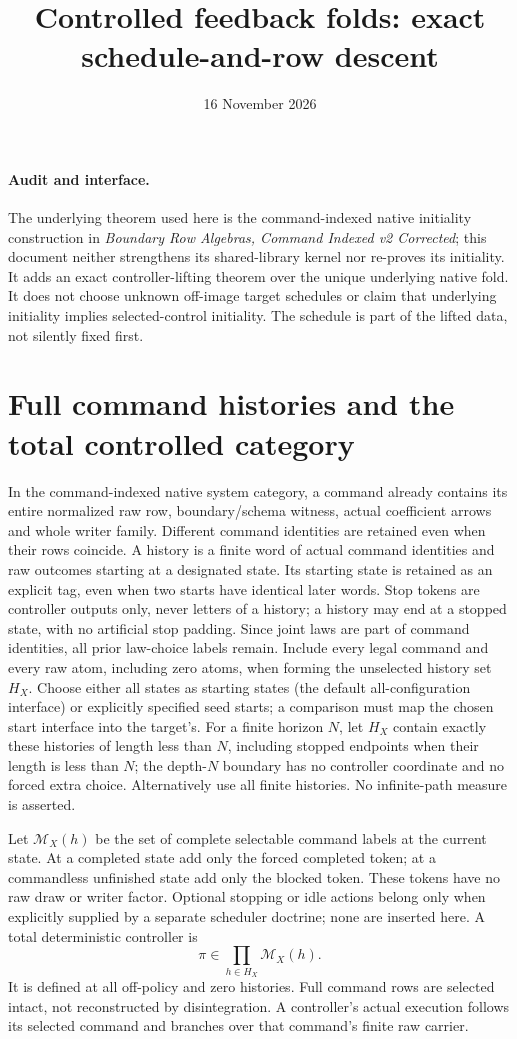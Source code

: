 \documentclass[11pt]{article}
\title{Controlled feedback folds: exact schedule-and-row descent}
\date{16 November 2026}
\begin{document}
\maketitle
\paragraph{Audit and interface.}
The underlying theorem used here is the command-indexed native initiality construction in \emph{Boundary Row Algebras, Command Indexed v2 Corrected}; this document neither strengthens its shared-library kernel nor re-proves its initiality. It adds an exact controller-lifting theorem over the unique underlying native fold. It does not choose unknown off-image target schedules or claim that underlying initiality implies selected-control initiality. The schedule is part of the lifted data, not silently fixed first.

\section{Full command histories and the total controlled category}
In the command-indexed native system category, a command already contains its entire normalized raw row, boundary/schema witness, actual coefficient arrows and whole writer family. Different command identities are retained even when their rows coincide. A history is a finite word of actual command identities and raw outcomes starting at a designated state. Its starting state is retained as an explicit tag, even when two starts have identical later words. Stop tokens are controller outputs only, never letters of a history; a history may end at a stopped state, with no artificial stop padding. Since joint laws are part of command identities, all prior law-choice labels remain. Include every legal command and every raw atom, including zero atoms, when forming the unselected history set $H_X$. Choose either all states as starting states (the default all-configuration interface) or explicitly specified seed starts; a comparison must map the chosen start interface into the target's. For a finite horizon $N$, let $H_X$ contain exactly these histories of length less than $N$, including stopped endpoints when their length is less than $N$; the depth-$N$ boundary has no controller coordinate and no forced extra choice. Alternatively use all finite histories. No infinite-path measure is asserted.

Let $\mathcal M_X(h)$ be the set of complete selectable command labels at the current state. At a completed state add only the forced completed token; at a commandless unfinished state add only the blocked token. These tokens have no raw draw or writer factor. Optional stopping or idle actions belong only when explicitly supplied by a separate scheduler doctrine; none are inserted here. A total deterministic controller is
\[
                    \pi\in\prod_{h\in H_X}\mathcal M_X(h). \tag{1}
\]
It is defined at all off-policy and zero histories. Full command rows are selected intact, not reconstructed by disintegration. A controller's actual execution follows its selected command and branches over that command's finite raw carrier.
\end{document}
